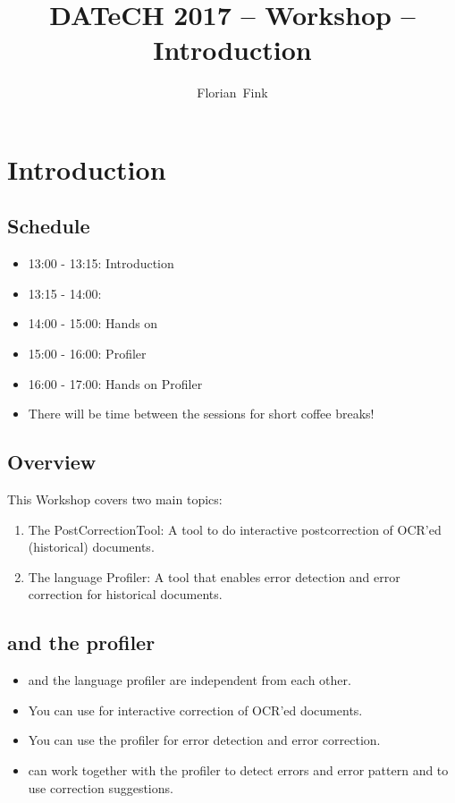 
\title{DATeCH 2017 -- \pocoto{} Workshop -- Introduction}
\author{Florian~Fink}



\begin{frame}
	\titlepage
\end{frame}

\section{Introduction}
\subsection{Schedule}
\begin{frame}
	\begin{itemize}
		\item 13:00 - 13:15: Introduction
		\item 13:15 - 14:00: \pocoto{}
		\item 14:00 - 15:00: Hands on \pocoto{}
		\item 15:00 - 16:00: Profiler
		\item 16:00 - 17:00: Hands on Profiler
		\item There will be time between the sessions for short coffee breaks!
	\end{itemize}
\end{frame}

\subsection{Overview}
\begin{frame}
	This Workshop covers two main topics:
	\begin{enumerate}
		\item The \pocoto{} PostCorrectionTool: A tool to do interactive
			postcorrection of OCR'ed (historical) documents.
		\item The language Profiler: A tool that enables error detection and error
			correction for historical documents.
	\end{enumerate}
\end{frame}

\subsection{\pocoto{} and the profiler}
\begin{frame}
	\begin{itemize}
		\item \pocoto{} and the language profiler are independent from each other.
		\item You can use \pocoto{} for interactive correction of OCR'ed documents.
		\item You can use the profiler for error detection and error correction.
		\item \pocoto{} can work together with the profiler to detect errors and
			error pattern and to use correction suggestions.
	\end{itemize}
\end{frame}

